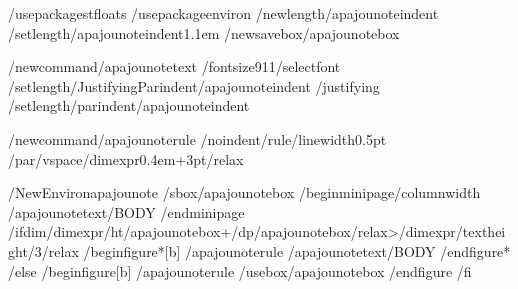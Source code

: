 %
%
%
%
/usepackage{stfloats}
/usepackage{environ}
/newlength{/apajounoteindent}
/setlength{/apajounoteindent}{1.1em}
/newsavebox{/apajounotebox}

/newcommand{/apajounotetext}{%
  /fontsize{9}{11}/selectfont
  /setlength{/JustifyingParindent}{/apajounoteindent}%
  /justifying
  /setlength{/parindent}{/apajounoteindent}}

/newcommand{/apajounoterule}{%
  /noindent/rule{/linewidth}{0.5pt}%
  /par/vspace{/dimexpr0.4em+3pt/relax}}

/NewEnviron{apajounote}{%
  /sbox{/apajounotebox}{%
    /begin{minipage}{/columnwidth}%
      /apajounotetext/BODY
    /end{minipage}}%
  /ifdim/dimexpr/ht/apajounotebox+/dp/apajounotebox/relax>/dimexpr/textheight/3/relax
    /begin{figure*}[b]%
      /apajounoterule
      /apajounotetext/BODY
    /end{figure*}%
  /else
    /begin{figure}[b]%
      /apajounoterule
      /usebox{/apajounotebox}%
    /end{figure}%
  /fi}

